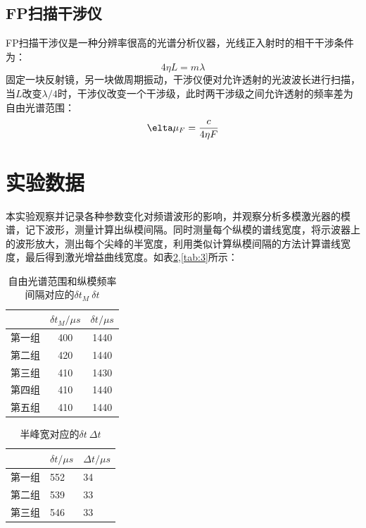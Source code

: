 \documentclass{buaaemp}
\begin{document}
\subsection{FP扫描干涉仪}
FP扫描干涉仪是一种分辨率很高的光谱分析仪器，光线正入射时的相干干涉条件为：
\begin{equation}
    4 \eta L=m \lambda
\end{equation}
固定一块反射镜，另一块做周期振动，干涉仪便对允许透射的光波波长进行扫描，当$L$改变$\lambda /4$时，干涉仪改变一个干涉级，此时两干涉级之间允许透射的频率差为自由光谱范围：
\begin{equation}
    \elta \mu_F =\frac{c}{4 \eta F}
\end{equation}
\section{实验数据}
本实验观察并记录各种参数变化对频谱波形的影响，并观察分析多模激光器的模谱，记下波形，测量计算出纵模间隔。同时测量每个纵模的谱线宽度，将示波器上的波形放大，测出每个尖峰的半宽度，利用类似计算纵模间隔的方法计算谱线宽度，最后得到激光增益曲线宽度。如表\ref{tab:2},\ref{tab:3}所示：
\begin{table}[]
    \centering
    \begin{tabular}{ccc}
    \hline
         & $\delta t_M / \mu s$ & $ \delta t / \mu s$ \\ \hline
第一组 & 400                                              & 1440                                          \\ \hline
第二组 & 420                                              & 1440                                          \\ \hline
第三组 & 410                                              & 1430                                          \\ \hline
第四组 & 410                                              & 1440                                          \\ \hline
第五组 & 410                                              & 1440     \\ \hline
    \end{tabular}
    \caption{ 自由光谱范围和纵模频率间隔对应的$\delta t_M\ \delta t $}
    \label{tab:1}
\end{table}


\begin{table}[]
\centering
\begin{tabular}{lll}
\hline
    & $\delta t / \mu s$& $\Delta t /\mu s $\\ \hline
第一组 & 552                                           & 34                                            \\ \hline
第二组 & 539                                           & 33                                            \\ \hline
第三组 & 546                                           & 33          \\
\hline

\end{tabular}
\caption{半峰宽对应的$\delta t\ \Delta t $}
\label{tab:2}
\end{table}
\end{document}
